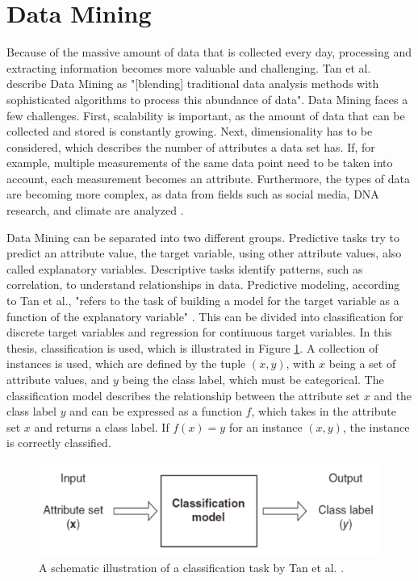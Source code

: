 \section{Data Mining}
Because of the massive amount of data that is collected every day, processing and extracting information becomes more valuable and challenging. Tan et al. describe Data Mining as "[blending] traditional data analysis methods with sophisticated algorithms to process this abundance of data"\cite[p.~21]{DBLP:books/aw/TanSKK2019}. Data Mining faces a few challenges. First, scalability is important, as the amount of data that can be collected and stored is constantly growing. Next, dimensionality has to be considered, which describes the number of attributes a data set has. If, for example, multiple measurements of the same data point need to be taken into account, each measurement becomes an attribute. Furthermore, the types of data are becoming more complex, as data from fields such as social media, DNA research, and climate are analyzed \cite{DBLP:books/aw/TanSKK2019}.

Data Mining can be separated into two different groups. Predictive tasks try to predict an attribute value, the target variable, using other attribute values, also called explanatory variables. Descriptive tasks identify patterns, such as correlation, to understand relationships in data. Predictive modeling, according to Tan et al., "refers to the task of building a model for the target variable as a function of the explanatory variable" \cite[p.~29]{DBLP:books/aw/TanSKK2019}. This can be divided into classification for discrete target variables and regression for continuous target variables. In this thesis, classification is used, which is illustrated in Figure \ref{fig:classifiation}. A collection of instances is used, which are defined by the tuple $(x,y)$, with $x$ being a set of attribute values, and $y$ being the class label, which must be categorical. The classification model describes the relationship between the attribute set $x$ and the class label $y$ and can be expressed as a function $f$, which takes in the attribute set $x$ and returns a class label. If $f(x) = y$ for an instance $(x,y)$, the instance is correctly classified.
\begin{figure}
    \centering
    \includegraphics[scale = 0.6]{Images/classification.png}
    \caption{A schematic illustration of a classification task by Tan et al. \cite[p.~134]{DBLP:books/aw/TanSKK2019}.}
    \label{fig:classifiation}
\end{figure}


